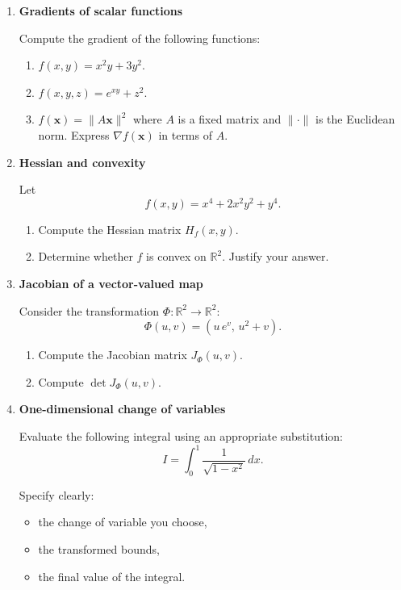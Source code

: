 \documentclass[11pt]{article}
\begin{document}
\begin{enumerate}
\item \textbf{Gradients of scalar functions}

Compute the gradient of the following functions:

\begin{enumerate}
\item \( f(x,y)=x^2y+3y^2 \).
\item \( f(x,y,z)=e^{xy}+z^2 \).
\item \( f(\bm{x})=\|A\bm{x}\|^2 \) where \(A\) is a fixed matrix and \(\|\cdot\|\) is the Euclidean norm. Express \(\nabla f(\bm{x})\) in terms of \(A\).
\end{enumerate}

\bigskip
\item \textbf{Hessian and convexity}

Let
\[
f(x,y)=x^4+2x^2y^2+y^4.
\]

\begin{enumerate}
\item Compute the Hessian matrix \(H_f(x,y)\).
\item Determine whether \(f\) is convex on \(\mathbb{R}^2\). Justify your answer.
\end{enumerate}

\bigskip
\item \textbf{Jacobian of a vector-valued map}

Consider the transformation \(\Phi: \mathbb{R}^2\to\mathbb{R}^2\):
\[
\Phi(u,v)=(u\,e^{v},\,u^2+v).
\]

\begin{enumerate}
\item Compute the Jacobian matrix \(J_\Phi(u,v)\).
\item Compute \(\det J_\Phi(u,v)\).
\end{enumerate}

\bigskip
\item \textbf{One-dimensional change of variables}

Evaluate the following integral using an appropriate substitution:
\[
I=\int_0^1 \frac{1}{\sqrt{1-x^2}}\,dx.
\]

Specify clearly:
\begin{itemize}
\item the change of variable you choose,
\item the transformed bounds,
\item the final value of the integral.
\end{itemize}


\end{enumerate}
\end{document}
